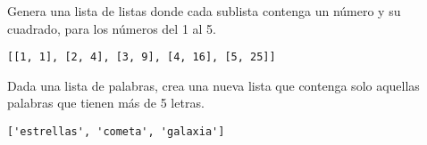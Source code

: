 \begin{exercise} Genera una lista de listas donde cada sublista contenga un número y su cuadrado, para los números del 1 al 5.

\begin{Shaded}
\begin{Highlighting}[]
\OperatorTok{=}\NormalTok{ [[x, x}\OperatorTok{**}\NormalTok{] } \NormalTok{(}\NormalTok{, }\NormalTok{)]}
\end{Highlighting}
\end{Shaded}

\begin{verbatim}
[[1, 1], [2, 4], [3, 9], [4, 16], [5, 25]]

\end{verbatim}
\end{exercise}

\begin{exercise} Dada una lista de palabras, crea una nueva lista que contenga solo aquellas palabras que tienen más de 5 letras.

\begin{Shaded}
\begin{Highlighting}[]
\OperatorTok{=}\NormalTok{ [}\NormalTok{, }\NormalTok{, }\NormalTok{, }\NormalTok{, }\NormalTok{]}
\OperatorTok{=}\NormalTok{ [palabra } \OperatorTok{\textgreater{}} \NormalTok{]}
\end{Highlighting}
\end{Shaded}

\begin{verbatim}
['estrellas', 'cometa', 'galaxia']

\end{verbatim}
\end{exercise}

